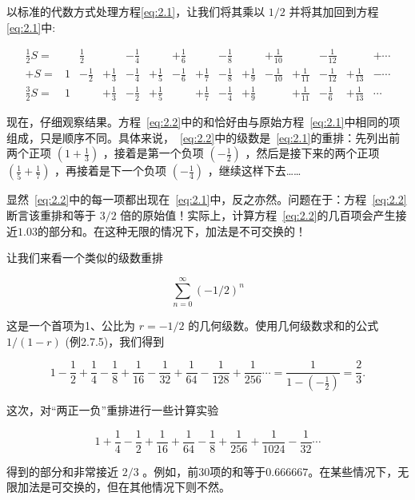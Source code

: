 以标准的代数方式处理方程\eqref{eq:2.1}，让我们将其乘以 \(1/2\) 并将其加回到方程\ref{eq:2.1}中:

\begin{align}
  \frac{1}{2}S = & &\frac{1}{2}&& - \frac{1}{4} &&+ \frac{1}{6}&& - \frac{1}{8} &&+ \frac{1}{10} &&- \frac{1}{12} &&+ \cdots\nonumber\\
  + S = & 1 &- \frac{1}{2} &+ \frac{1}{3}& - \frac{1}{4}& + \frac{1}{5}& - \frac{1}{6}& + \frac{1}{7}& - \frac{1}{8}& + \frac{1}{9}& - \frac{1}{10}& + \frac{1}{11}& - \frac{1}{12}& + \frac{1}{13}& - \cdots\nonumber\\[10pt]
  \hline
  \frac{3}{2}S = & 1 &&+ \frac{1}{3}& - \frac{1}{2}& + \frac{1}{5} &&+ \frac{1}{7}& - \frac{1}{4}& + \frac{1}{9}&&+ \frac{1}{11} &- \frac{1}{6}& + \frac{1}{13}&\cdots\label{eq:2.2}
\end{align}


现在，仔细观察结果。方程~\eqref{eq:2.2}中的和恰好由与原始方程~\eqref{eq:2.1}中相同的项组成，只是顺序不同。具体来说，~\eqref{eq:2.2}中的级数是~\eqref{eq:2.1}的重排：先列出前两个正项 \(\left( {1 + \frac{1}{3}}\right)\) ，接着是第一个负项 \(\left( {-\frac{1}{2}}\right)\) ，然后是接下来的两个正项 \(\left( {\frac{1}{5} + \frac{1}{7}}\right)\) ，再接着是下一个负项 \(\left( {-\frac{1}{4}}\right)\) ，继续这样下去……

显然~\eqref{eq:2.2}中的每一项都出现在~\eqref{eq:2.1}中，反之亦然。问题在于：方程~\eqref{eq:2.2}断言该重排和等于 \(3/2\) 倍的原始值！实际上，计算方程~\eqref{eq:2.2}的几百项会产生接近$1.03$的部分和。在这种无限的情况下，加法是不可交换的！

让我们来看一个类似的级数重排

\[
\mathop{\sum }\limits_{{n = 0}}^{\infty }{\left( -1/2\right) }^{n}
\]

这是一个首项为1、公比为 \(r =  - 1/2\) 的几何级数。使用几何级数求和的公式 \(1/\left( {1 - r}\right)\) (例2.7.5)，我们得到

\[
1 - \frac{1}{2} + \frac{1}{4} - \frac{1}{8} + \frac{1}{16} - \frac{1}{32} + \frac{1}{64} - \frac{1}{128} + \frac{1}{256}\cdots  = \frac{1}{1 - \left( {-\frac{1}{2}}\right) } = \frac{2}{3}.
\]

这次，对“两正一负”重排进行一些计算实验

\[
1 + \frac{1}{4} - \frac{1}{2} + \frac{1}{16} + \frac{1}{64} - \frac{1}{8} + \frac{1}{256} + \frac{1}{1024} - \frac{1}{32}\cdots
\]

得到的部分和非常接近 \(2/3\) 。例如，前$30$项的和等于$0.666667$。在某些情况下，无限加法是可交换的，但在其他情况下则不然。

